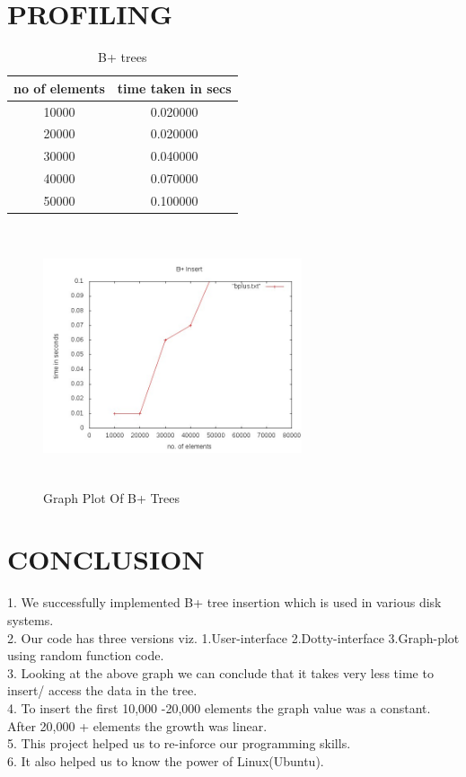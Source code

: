 \documentclass{article}
\begin{document}
\section{PROFILING}


\begin{table}[h]
\caption{B+ trees}
\centering


\begin{tabular}{|c|c|} 
\hline 
\hline 
no of elements  &  time taken in secs\\ 
\hline 

10000 & 0.020000\\ 
20000 &0.020000 \\
30000 & 0.040000 \\
40000 & 0.070000 \\
50000 & 0.100000 \\
\hline 

\end{tabular}
\end{table}
\begin{figure}
\includegraphics[height=3in,width=3in]{bplus.jpg}
\caption{Graph Plot Of B+ Trees}
\end{figure}

\pagebreak

\section{CONCLUSION}
 1. We successfully implemented B+ tree insertion which is used in various disk systems.\\
 2. Our code has three versions viz. 1.User-interface 2.Dotty-interface 3.Graph-plot using random function code.\\
 3. Looking at the above graph we can conclude that it takes very less time to insert/ access the data in the tree.\\
 4. To insert the first 10,000 -20,000 elements the graph value was a constant. After 20,000 + elements the growth was linear.\\
 5. This project helped us to re-inforce our programming skills.\\
 6. It also helped us to know the power of Linux(Ubuntu).
\end{document}
